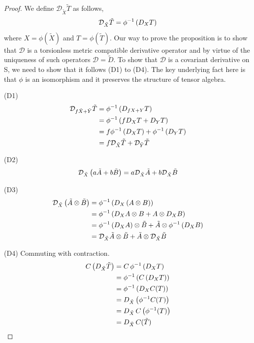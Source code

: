 \begin{proof}
    We define $\mathcal{D}_{\tilde{X}} \tilde{T}$ as follows,
\begin{align*}
	\mathcal{D}_{\tilde{X}} \tilde{T} = \phi^{-1}\left( D_X T \right)
\end{align*}
where $X = \phi(\tilde{X})$ and $T = \phi(\tilde{T})$. Our way to prove the proposition is to show that $ \mathcal{D}$ is a torsionless metric compatible derivative operator and by virtue of the uniqueness of such operators $ \mathcal{D} = \tilde{D}$. To show that $\mathcal{D}$ is a covariant derivative on S, we need to show that it follows (D1) to (D4). The key underlying fact here is that $ \phi$ is an isomorphism and it preserves the structure of tensor algebra. 

(D1)
\begin{align*}
	\mathcal{D}_{f\tilde{X} + \tilde{Y}} \tilde{T} &= \phi^{-1}\left( D_{fX + Y} T \right) \\
	&= \phi^{-1}\left( f D_X T + D_Y T \right) \\
	&= f \phi^{-1}\left( D_X T \right) + \phi^{-1}\left( D_Y T \right) \\
	&= f \mathcal{D}_{\tilde{X}} \tilde{T} + \mathcal{D}_{\tilde{Y}} \tilde{T}
\end{align*}

(D2)
\begin{align*}
	\mathcal{D}_{\tilde{X}}\left( a\tilde{A} + b\tilde{B} \right) = a \mathcal{D}_{\tilde{X}} \tilde{A} + b \mathcal{D}_{\tilde{X}} \tilde{B}
\end{align*}

(D3)
\begin{align*}
	\mathcal{D}_{\tilde{X}}\left( \tilde{A} \otimes \tilde{B} \right) &= \phi^{-1}\left( D_X\left( A \otimes B \right) \right) \\
	&= \phi^{-1}\left( D_X A \otimes B + A \otimes D_X B \right) \\
	&= \phi^{-1}\left( D_X A \right) \otimes \tilde{B} + \tilde{A} \otimes \phi^{-1}\left( D_X B \right) \\
	&= \mathcal{D}_{\tilde{X}} \tilde{A} \otimes \tilde{B} + \tilde{A} \otimes \mathcal{D}_{\tilde{X}} \tilde{B}
\end{align*}

(D4) Commuting with contraction.
\begin{align*}
	C\left( D_{\tilde{X}} \tilde{T} \right) &= C\, \phi^{-1}\left( D_X T \right) \\
	&= \phi^{-1}\left( C\left( D_X T \right) \right) \\
	&= \phi^{-1}\left( D_X C(T) \right) \\
	&= D_{\tilde{X}}\left( \phi^{-1} C(T) \right) \\
	&= D_{\tilde{X}}\, C\left( \phi^{-1}(T) \right) \\
	&= D_{\tilde{X}}\, C(\tilde{T})
\end{align*}


\end{proof}
